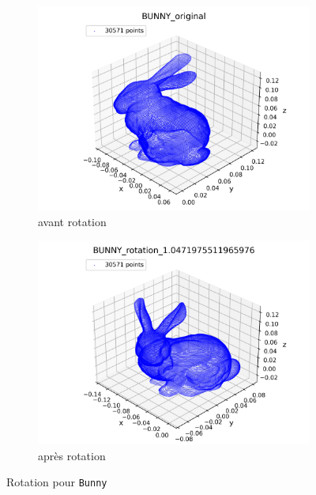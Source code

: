 \documentclass[../5RO17_TP4.tex]{subfiles}
\begin{document}
\begin{figure}[H]
    \centering
    \begin{subfigure}[b]{0.475\textwidth}
        \centering
        \includegraphics[width=\linewidth]{images/BUNNY_original.png}
        \caption{avant rotation}
        \label{}
    \end{subfigure}\hfill
    \begin{subfigure}[b]{0.475\textwidth}
        \centering
        \includegraphics[width=\linewidth]{images/BUNNY_rotation_1.0471975511965976.png}
        \caption{après rotation}
        \label{}
    \end{subfigure}
    \caption{Rotation pour \texttt{Bunny}}
    \label{}
\end{figure}
\end{document}
